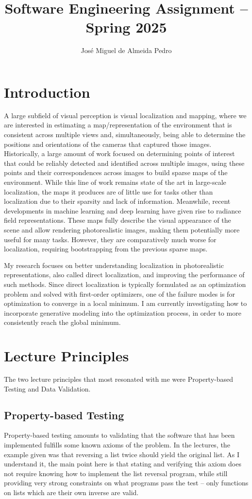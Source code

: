 \documentclass[11pt]{article}
\title{\vspace{-3cm}\LARGE{Software Engineering Assignment -- Spring 2025}}
\author{José Miguel de Almeida Pedro}
\date{}
\begin{document}
\maketitle

\section{Introduction}

A large subfield of visual perception is visual localization and mapping, where we are interested in estimating a map/representation of the environment that is consistent across multiple views and, simultaneously, being able to determine the positions and orientations of the cameras that captured those images.
Historically, a large amount of work focused on determining points of interest that could be reliably detected and identified across multiple images, using these points and their correspondences across images to build sparse maps of the environment.
While this line of work remains state of the art in large-scale localization, the maps it produces are of little use for tasks other than localization due to their sparsity and lack of information.
Meanwhile, recent developments in machine learning and deep learning have given rise to radiance field representations.
These maps fully describe the visual appearance of the scene and allow rendering photorealistic images, making them potentially more useful for many tasks.
However, they are comparatively much worse for localization, requiring bootstrapping from the previous sparse maps.

My research focuses on better understanding localization in photorealistic representations, also called direct localization, and improving the performance of such methods.
Since direct localization is typically formulated as an optimization problem and solved with first-order optimizers, one of the failure modes is for optimization to converge in a local minimum.
I am currently investigating how to incorporate generative modeling into the optimization process, in order to more consistently reach the global minimum.

\section{Lecture Principles}
The two lecture principles that most resonated with me were Property-based Testing and Data Validation.

\subsection{Property-based Testing}
Property-based testing amounts to validating that the software that has been implemented fulfills some known axioms of the problem.
In the lectures, the example given was that reversing a list twice should yield the original list.
As I understand it, the main point here is that stating and verifying this axiom does not require knowing how to implement the list reversal program,
while still providing very strong constraints on what programs pass the test -- only functions on lists which are their own inverse are valid.
\end{document}
